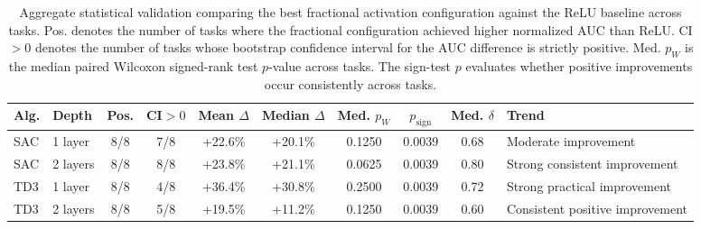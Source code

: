 \begin{table}[t]
\centering
\caption{Aggregate statistical validation comparing the best fractional activation configuration against the ReLU baseline across tasks. Pos. denotes the number of tasks where the fractional configuration achieved higher normalized AUC than ReLU. CI$>0$ denotes the number of tasks whose bootstrap confidence interval for the AUC difference is strictly positive. Med. $p_W$ is the median paired Wilcoxon signed-rank test $p$-value across tasks. The sign-test $p$ evaluates whether positive improvements occur consistently across tasks.}
\label{tab:stats-main}
\scriptsize
\setlength{\tabcolsep}{3.5pt}
\renewcommand{\arraystretch}{1.12}
\begin{tabularx}{\textwidth}{llccccccc>{\raggedright\arraybackslash}X}
\toprule
\textbf{Alg.} & \textbf{Depth} & \textbf{Pos.} & \textbf{CI$>0$} & \textbf{Mean $\Delta$} & \textbf{Median $\Delta$} & \textbf{Med. $p_W$} & \textbf{$p_{\mathrm{sign}}$} & \textbf{Med. $\delta$} & \textbf{Trend} \\
\midrule
SAC & 1 layer & 8/8 & 7/8 & +22.6\% & +20.1\% & 0.1250 & 0.0039 & 0.68 & Moderate improvement \\
SAC & 2 layers & 8/8 & 8/8 & +23.8\% & +21.1\% & 0.0625 & 0.0039 & 0.80 & Strong consistent improvement \\
TD3 & 1 layer & 8/8 & 4/8 & +36.4\% & +30.8\% & 0.2500 & 0.0039 & 0.72 & Strong practical improvement \\
TD3 & 2 layers & 8/8 & 5/8 & +19.5\% & +11.2\% & 0.1250 & 0.0039 & 0.60 & Consistent positive improvement \\
\bottomrule
\end{tabularx}
\end{table}
